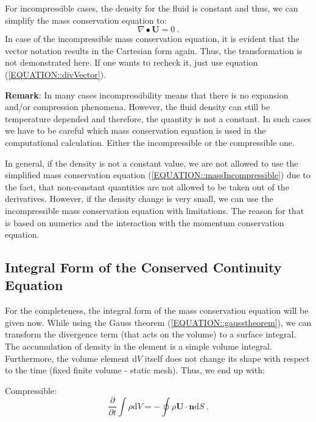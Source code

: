 	For incompressible cases, the density for the fluid is constant and thus,
    we can simplify the mass conservation equation to:
%
%
\begin{equation}
 \boxed{  \nabla \bullet \textbf{U} = 0} ~.
 \label{EQUATION::massIncompressible}
\end{equation}
%
%
	In case of the incompressible mass conservation equation, it is evident
    that the vector notation results in the Cartesian form again. Thus,
    the transformation is not demonstrated here. If one wants to recheck it,
    just use equation (\ref{EQUATION::divVector}).

	\textbf{Remark}: In many cases incompressibility means that there is no
    expansion and/or compression phenomena. However, the fluid density can
    still be temperature depended and therefore, the quantity is not a
    constant. In such cases we have to be careful which mass conservation
    equation is used in the computational calculation. Either the
    incompressible or the compressible one.

	In general, if the density is not a constant value, we are not allowed to
    use the simplified mass conservation equation
    (\ref{EQUATION::massIncompressible}) due to the fact, that non-constant
    quantities are not allowed to be taken out of the derivatives. However,
    if the density change is very small, we can use the incompressible mass
    conservation equation with limitations. The reason for that is based
    on numerics and the interaction with the momentum conservation equation.

%
%
\subsection{Integral Form of the Conserved Continuity Equation}
%
%
	For the completeness, the integral form of the mass conservation equation
    will be given now. While using the Gauss theorem
    (\ref{EQUATION::gausstheorem}), we can transform the divergence term
    (that acts on the volume) to a surface integral. The accumulation of
    density in the element is a simple volume integral. Furthermore, the
    volume element d$V$ itself does not change its shape with respect to
    the time (fixed finite volume - static mesh). Thus, we end up with:
%
%

	Compressible:
%
%
\begin{equation}
 \boxed{
 \frac{\partial}{\partial t} \int \rho \mathrm{d}V=
 -   \oint \rho \textbf{U} \cdot \textbf{n} \mathrm{d}S
   } ~.
\end{equation}
%
%


